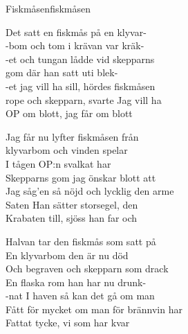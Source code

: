 \begin{song}{Fiskmåsen}{fiskmåsen}
\begin{vers}
Det satt en fiskmås på en klyvar-\\
-bom och tom i krävan var kräk-\\
-et och tungan lådde vid skepparns\\
gom där han satt uti blek-\\
-et jag vill ha sill, hördes fiskmåsen\\
rope och skepparn, svarte Jag vill ha\\
OP om blott, jag får om blott\\
\end{vers}
\begin{vers}
Jag får nu lyfter fiskmåsen från\\
klyvarbom och vinden spelar\\
I tågen OP:n svalkat har\\
Skepparns gom jag önskar blott att\\
Jag såg'en så nöjd och lycklig den arme\\
Saten Han sätter storsegel, den\\
Krabaten till, sjöss han far och\\
\end{vers}
\begin{vers}
Halvan tar den fiskmås som satt på\\
En klyvarbom den är nu död\\
Och begraven och skepparn som drack\\
En flaska rom han har nu drunk-\\
-nat I haven så kan det gå om man\\
Fått för mycket om man för brännvin har\\
Fattat tycke, vi som har kvar\\
\end{vers}
\end{song}

